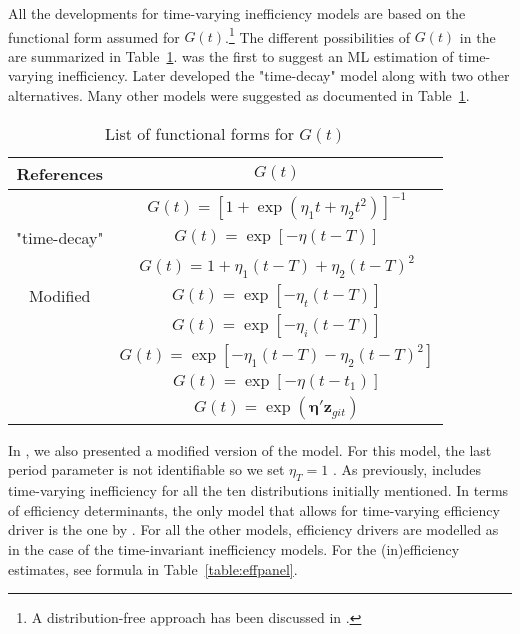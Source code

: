 \documentclass[nojss]{jss}
\begin{document}
All the developments for time-varying inefficiency models are based on the 
functional form assumed for $G(t)$.\footnote{A distribution-free approach has 
been discussed in \citet{css90, lees93}.} The different possibilities of $G(t)$ in 
the  are summarized in Table~\ref{table:gt}. \citet{kum90} was the 
first to suggest an ML estimation of time-varying inefficiency. Later \citet{batco92}
developed the "time-decay" model along with two other alternatives. Many other
models were suggested as documented in Table~\ref{table:gt}. 

\begin{table}
\renewcommand{\arraystretch}{1.3}
\centering
\begin{tabular}{@{}cc@{}}
\toprule
References & $G(t)$ \\[1em]
\midrule
\citet{kum90} & $G(t)=\left[1+\exp{\left(\eta_1t + \eta_2t^2\right)}\right]^{-1}$ \\[1em]
\citet{batco92} "time-decay" & $G(t)=\exp{\left[-\eta(t-T)\right]}$ \\[1em]
\citet{batco92} & $G(t)= 1 + \eta_1(t-T) + \eta_2(t-T)^2$ \\[1em]
Modified \citet{lees93} & $G(t)=\exp{\left[-\eta_t(t-T)\right]}$ \\[1em] 
\citet{cue00} & $G(t)=\exp{\left[-\eta_i(t-T)\right]}$ \\[1em] 
\citet{cue02, feng09} & $G(t)=\exp{\left[-\eta_1(t-T)-\eta_2(t-T)^2\right]}$ \\[1em] 
\citet{kw05} & $G(t)=\exp{\left[-\eta(t-t_1)\right]}$ \\[1em]
\citet{al06} & $G(t)=\exp{\left(\bm{\eta}'\mathbf{z}_{git}\right)}$ \\[1em]
\bottomrule
\end{tabular}
\caption{List of functional forms for $G(t)$}
\label{table:gt}
\end{table}

In , we also presented a modified version of the \citet{lees93} model. 
For this model, the last period parameter is not identifiable so we set 
$\eta_T=1$ \citep[p.~304]{par14}. As previously,  includes
time-varying inefficiency for all the ten distributions initially mentioned.
In terms of efficiency determinants, the only model that allows for time-varying
efficiency driver is the one by \citet{al06}. For all the other models, efficiency
drivers are modelled as in the case of the time-invariant inefficiency models. 
For the (in)efficiency estimates, see formula in Table~\ref{table:effpanel}.
\end{document}
